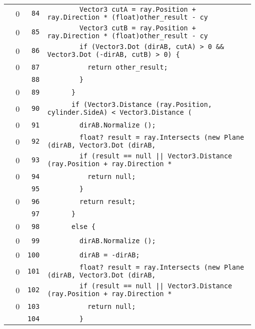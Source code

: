 \documentclass[a4paper,10pt]{article}
\begin{document}
\begin{longtable}[l]{lrrl}
\cellcolor{red} & 0 & \verb~84~ & \verb~        Vector3 cutA = ray.Position + ray.Direction * (float)other_result - cy~\\
\cellcolor{red} & 0 & \verb~85~ & \verb~        Vector3 cutB = ray.Position + ray.Direction * (float)other_result - cy~\\
\cellcolor{red} & 0 & \verb~86~ & \verb~        if (Vector3.Dot (dirAB, cutA) > 0 && Vector3.Dot (-dirAB, cutB) > 0) {~\\
\cellcolor{red} & 0 & \verb~87~ & \verb~          return other_result;~\\
\cellcolor{gray} &  & \verb~88~ & \verb~        }~\\
\cellcolor{red} & 0 & \verb~89~ & \verb~      }~\\
\cellcolor{red} & 0 & \verb~90~ & \verb~      if (Vector3.Distance (ray.Position, cylinder.SideA) < Vector3.Distance (~\\
\cellcolor{red} & 0 & \verb~91~ & \verb~        dirAB.Normalize ();~\\
\cellcolor{red} & 0 & \verb~92~ & \verb~        float? result = ray.Intersects (new Plane (dirAB, Vector3.Dot (dirAB, ~\\
\cellcolor{red} & 0 & \verb~93~ & \verb~        if (result == null || Vector3.Distance (ray.Position + ray.Direction *~\\
\cellcolor{red} & 0 & \verb~94~ & \verb~          return null;~\\
\cellcolor{gray} &  & \verb~95~ & \verb~        }~\\
\cellcolor{red} & 0 & \verb~96~ & \verb~        return result;~\\
\cellcolor{gray} &  & \verb~97~ & \verb~      }~\\
\cellcolor{red} & 0 & \verb~98~ & \verb~      else {~\\
\cellcolor{red} & 0 & \verb~99~ & \verb~        dirAB.Normalize ();~\\
\cellcolor{red} & 0 & \verb~100~ & \verb~        dirAB = -dirAB;~\\
\cellcolor{red} & 0 & \verb~101~ & \verb~        float? result = ray.Intersects (new Plane (dirAB, Vector3.Dot (dirAB, ~\\
\cellcolor{red} & 0 & \verb~102~ & \verb~        if (result == null || Vector3.Distance (ray.Position + ray.Direction *~\\
\cellcolor{red} & 0 & \verb~103~ & \verb~          return null;~\\
\cellcolor{gray} &  & \verb~104~ & \verb~        }~\\

\end{longtable}
\end{document}
